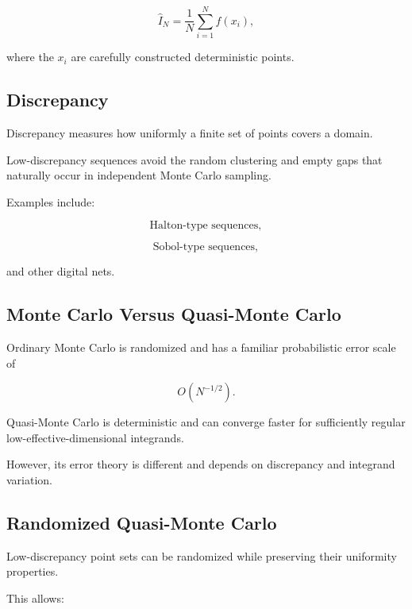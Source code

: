 \[
\boxed{
\widehat{I}_N
=
\frac1N
\sum_{i=1}^{N}
f(x_i),
}
\]

where the \(x_i\) are carefully constructed deterministic points.

\subsection{Discrepancy}
\label{subsec:quasi-monte-carlo-discrepancy}

Discrepancy measures how uniformly a finite set of points covers a domain.

Low-discrepancy sequences avoid the random clustering and empty gaps that
naturally occur in independent Monte Carlo sampling.

Examples include:

\[
\boxed{
\text{Halton-type sequences},
}
\]

\[
\boxed{
\text{Sobol-type sequences},
}
\]

and other digital nets.

\subsection{Monte Carlo Versus Quasi-Monte Carlo}
\label{subsec:mc-vs-qmc}

Ordinary Monte Carlo is randomized and has a familiar probabilistic error
scale of

\[
O(N^{-1/2}).
\]

Quasi-Monte Carlo is deterministic and can converge faster for sufficiently
regular low-effective-dimensional integrands.

However, its error theory is different and depends on discrepancy and
integrand variation.

\subsection{Randomized Quasi-Monte Carlo}
\label{subsec:randomized-qmc}

Low-discrepancy point sets can be randomized while preserving their
uniformity properties.

This allows:

